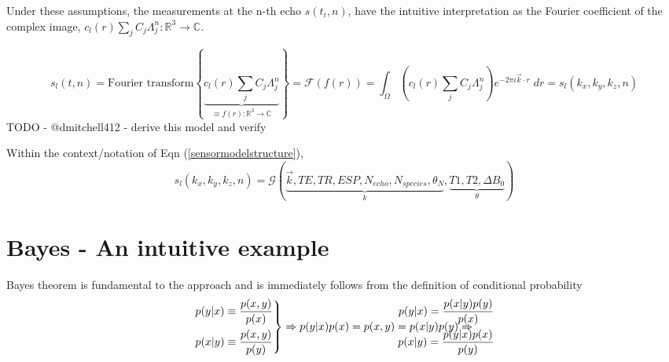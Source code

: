 \documentclass{article}         %
\theoremstyle{definition}
\theoremstyle{remark}
\newcommand{\eqn}[1]{(\ref{#1})}
\begin{document}
Under these assumptions, the measurements at the n-th echo $s(t_i,n)$, 
have the intuitive interpretation
as the Fourier coefficient of the complex image, 
$c_l(r) \sum_j C_j \Lambda_j^n : \mathbb{R}^3 \rightarrow \mathbb{C}$.
 
\begin{equation}
\label{FFTmultiecho}
 s_l(t,n) = \text{Fourier transform} \left\{ \underbrace{c_l(r) \sum_j C_j \Lambda_j^n }_{\equiv f(r):\mathbb{R}^3 \rightarrow \mathbb{C} } \right\}
          = \mathcal{F}(f(r))
          = \int_\Omega \left(c_l(r) \sum_j C_j \Lambda_j^n \right)
          e^{-2  \pi i \vec{k}  \cdot r } \; dr
          = s_l(k_x,k_y,k_z,n)
\end{equation}
        {\color{red} TODO - @dmitchell412 - derive this model and verify  }

Within the context/notation of Eqn \eqn{sensormodelstructure},
\[
           s_l(k_x,k_y,k_z,n) =
\mathcal{G}\left(\underbrace{\vec{k},TE,TR,ESP, N_{echo}, N_{species},
\theta_N}_{k}
,\underbrace{T1,T2,\Delta B_0}_\theta\right)
\]

\nocite{*}



\appendix
\section{Bayes - An intuitive example}
Bayes theorem is fundamental to the approach and is immediately
follows from the definition of conditional probability
\[
\left.
\begin{split}
p(y|x)  \equiv  \frac{p(x,y)}{p(x)}  \\
p(x|y)  \equiv  \frac{p(x,y)}{p(y)} 
\end{split}
\right\}
\Rightarrow
p(y|x) p(x) = p(x,y) = p(x|y) p(y)
\Rightarrow
\hspace{-1in}
\begin{split}
p(y|x)  =\frac{ p(x|y) p(y) }{p(x) } \\
p(x|y)  =\frac{ p(y|x) p(x) }{p(y) } \\
\end{split}
\]
\end{document}
